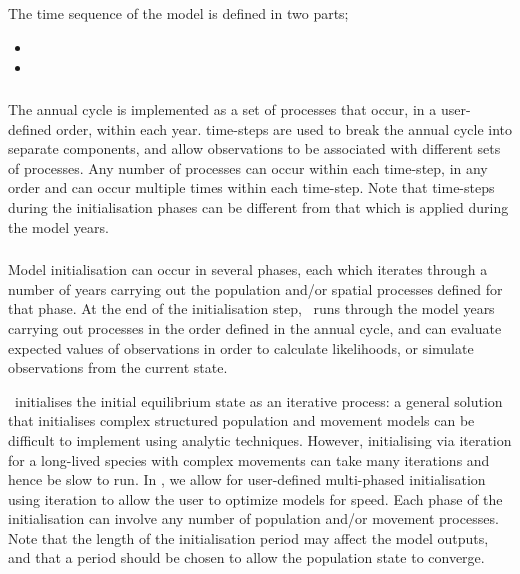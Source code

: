 \subsection{}

The time sequence of the model is defined in two parts;
\begin{itemize}
  \item {}
  \item {}
\end{itemize}

\subsubsection{}

The annual cycle is implemented as a set of processes that occur, in a user-defined order, within each year. time-steps are used to break the annual cycle into separate components, and allow observations to be associated with different sets of processes. Any number of processes can occur within each time-step, in any order and can occur multiple times within each time-step. Note that time-steps during the initialisation phases can be different from that which is applied during the model years.

\subsubsection{}

Model initialisation can occur in several phases, each which iterates through a number of years carrying out the population and/or spatial processes defined for that phase. At the end of the initialisation step, \SPM\ runs through the model years carrying out processes in the order defined in the annual cycle, and can evaluate expected values of observations in order to calculate likelihoods, %
or simulate observations from the current state.

\SPM\ initialises the initial equilibrium state as an iterative process: a general solution that initialises complex structured population and movement models can be difficult to implement using analytic techniques. However, initialising via iteration for a long-lived species with complex movements can take many iterations and hence be slow to run. In \SPM, we allow for user-defined multi-phased initialisation using iteration to allow the user to optimize models for speed. Each phase of the initialisation can involve any number of population and/or movement processes. Note that the length of the initialisation period may affect the model outputs, and that a period should be chosen to allow the population state to converge.

